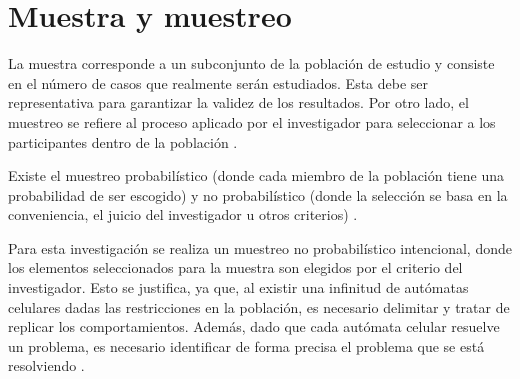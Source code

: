\section{Muestra y muestreo}

La muestra corresponde a un subconjunto de la población de estudio y consiste en el número de casos que realmente serán estudiados. Esta debe ser representativa para garantizar la validez de los resultados. Por otro lado, el muestreo se refiere al proceso aplicado por el investigador para seleccionar a los participantes dentro de la población \cite{muestra}.

Existe el muestreo probabilístico (donde cada miembro de la población tiene una probabilidad de ser escogido) y no probabilístico (donde la selección se basa en la conveniencia, el juicio del investigador u otros criterios) \cite{muestra}. 

Para esta investigación se realiza un muestreo no probabilístico intencional, donde los elementos seleccionados para la muestra son elegidos por el criterio del investigador. Esto se justifica, ya que, al existir una infinitud de autómatas celulares dadas las restricciones en la población, es necesario delimitar y tratar de replicar los comportamientos. Además, dado que cada autómata celular resuelve un problema, es necesario identificar de forma precisa el problema que se está resolviendo \cite{computationalBiology2016}.